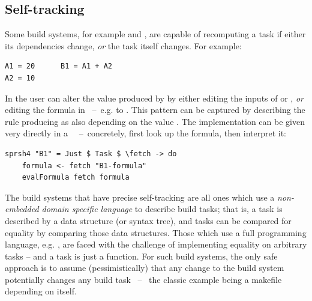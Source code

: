 
\subsection{Self-tracking}\label{sec-tracking-aspects}

Some build systems, for example \Excel and \Ninja, are capable of recomputing a
task if either its dependencies change, \emph{or} the task itself changes. For
example:

\vspace{1mm}
\begin{verbatim}
A1 = 20      B1 = A1 + A2
A2 = 10
\end{verbatim}
\vspace{1mm}

\noindent
In \Excel the user can alter the value produced by  by either editing
the inputs of  or , \emph{or} editing the formula in
~--~e.g. to . This pattern can be captured by describing
the rule producing  as also depending on the value .
The implementation can be given very directly in a
~~--~concretely, first look up the formula, then interpret
it:

\vspace{1mm}
\begin{verbatim}
sprsh4 "B1" = Just $ Task $ \fetch -> do
    formula <- fetch "B1-formula"
    evalFormula fetch formula
\end{verbatim}
\vspace{1mm}

\noindent
The build systems that have precise self-tracking are all ones which
use a \emph{non-embedded domain specific language} to describe build
tasks; that is, a task is described by a data structure (or syntax
tree), and tasks can be compared for equality by comparing those data
structures. Those which use a full programming language, e.g. \Shake,
are faced with the challenge of implementing equality on arbitrary
tasks -- and a task is just a function.  For such build systems, the
only safe approach is to assume (pessimistically) that any
change to the build system potentially changes any build task ~--~ the
classic example being a makefile depending on itself.

